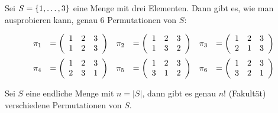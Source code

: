 \begin{example}
Sei $S = \{1, \dots ,3\}$ eine Menge mit drei Elementen. Dann gibt
es, wie man ausprobieren kann, genau $6$ Permutationen von $S$:

\begin{displaymath}
\begin{array}{rlrlrl}
\pi_1 &= \left( 
\begin{array}{ccc}
1 & 2 & 3\\
1 & 2 & 3
\end{array}
\right)
&
\pi_2 &= \left( 
\begin{array}{ccc}
1 & 2 & 3\\
1 & 3 & 2
\end{array}
\right)
&
\pi_3 &= \left( 
\begin{array}{ccc}
1 & 2 & 3\\
2 & 1 & 3
\end{array}
\right)\\[\bigskipamount]
%
\pi_4 &= \left( 
\begin{array}{ccc}
1 & 2 & 3\\
2 & 3 & 1
\end{array}
\right)
&
\pi_5 &= \left( 
\begin{array}{ccc}
1 & 2 & 3\\
3 & 1 & 2
\end{array}
\right)
&
\pi_6 &= \left( 
\begin{array}{ccc}
1 & 2 & 3\\
3 & 2 & 1
\end{array}
\right)\\
\end{array}
\end{displaymath}
\end{example}

\begin{theorem}
Sei $S$ eine endliche Menge mit $n = |S|$, dann gibt es genau $n!$
(Fakultät) verschiedene Permutationen von $S$.
\end{theorem}

